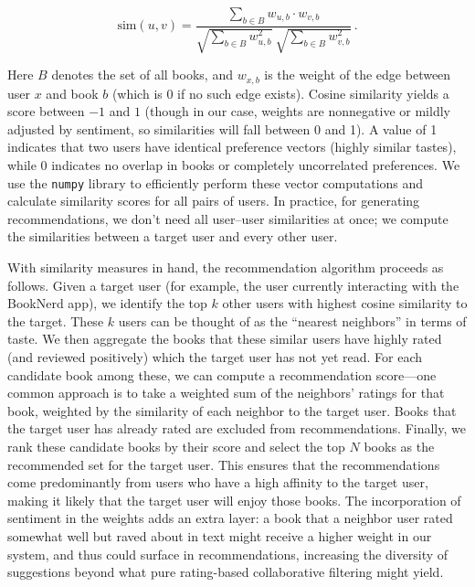 \documentclass[11pt]{article}
\begin{document}
\[
\text{sim}(u,v) = \frac{\displaystyle\sum_{b \in B} w_{u,b} \cdot w_{v,b}}{\sqrt{\displaystyle\sum_{b \in B} w_{u,b}^2}\ \sqrt{\displaystyle\sum_{b \in B} w_{v,b}^2}}\,. 
\]

Here $B$ denotes the set of all books, and $w_{x,b}$ is the weight of the edge between user $x$ and book $b$ (which is 0 if no such edge exists). Cosine similarity yields a score between $-1$ and $1$ (though in our case, weights are nonnegative or mildly adjusted by sentiment, so similarities will fall between 0 and 1). A value of 1 indicates that two users have identical preference vectors (highly similar tastes), while 0 indicates no overlap in books or completely uncorrelated preferences. We use the \texttt{numpy} library to efficiently perform these vector computations and calculate similarity scores for all pairs of users. In practice, for generating recommendations, we don’t need all user–user similarities at once; we compute the similarities between a target user and every other user.

With similarity measures in hand, the recommendation algorithm proceeds as follows. Given a target user (for example, the user currently interacting with the BookNerd app), we identify the top $k$ other users with highest cosine similarity to the target. These $k$ users can be thought of as the “nearest neighbors” in terms of taste. We then aggregate the books that these similar users have highly rated (and reviewed positively) which the target user has not yet read. For each candidate book among these, we can compute a recommendation score—one common approach is to take a weighted sum of the neighbors’ ratings for that book, weighted by the similarity of each neighbor to the target user. Books that the target user has already rated are excluded from recommendations. Finally, we rank these candidate books by their score and select the top $N$ books as the recommended set for the target user. This ensures that the recommendations come predominantly from users who have a high affinity to the target user, making it likely that the target user will enjoy those books. The incorporation of sentiment in the weights adds an extra layer: a book that a neighbor user rated somewhat well but raved about in text might receive a higher weight in our system, and thus could surface in recommendations, increasing the diversity of suggestions beyond what pure rating-based collaborative filtering might yield.
\end{document}
